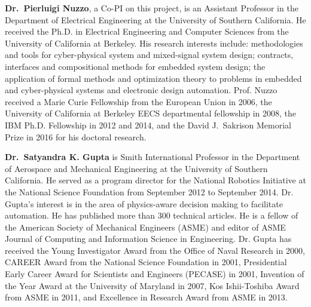 \documentclass[12pt]{dod-blank}
\begin{document}
{\bf Dr.\ Pierluigi Nuzzo}, a Co-PI on this project, is an Assistant Professor in the Department of Electrical Engineering at the University of Southern California. He received the Ph.D. in Electrical Engineering and Computer Sciences from the University of California at Berkeley. 
%
His research interests
include: methodologies and tools for cyber-physical system and mixed-signal
system design; contracts, interfaces and compositional methods for embedded
system design; the application of formal methods and optimization theory to problems in embedded and cyber-physical systems and electronic design automation. 
%
Prof. Nuzzo received %
a Marie Curie Fellowship
from the European Union in 2006, 
the University of California at Berkeley EECS
departmental fellowship in 2008, 
the IBM Ph.D.
Fellowship in 2012 and 2014, 
and the David J.~Sakrison Memorial Prize in 2016 for his doctoral research. 

{\bf Dr.\ Satyandra K. Gupta} is Smith International Professor in the Department of Aerospace and Mechanical Engineering at the University of Southern California. %
He served as a program director for the National Robotics Initiative at the National Science Foundation from September 2012 to September 2014.  Dr. Gupta's interest is in the area of physics-aware decision making to facilitate automation. He has published more than 300 technical articles. He is a fellow of the American Society of Mechanical Engineers (ASME) and editor of ASME Journal of Computing and Information Science in Engineering. Dr. Gupta has received the Young Investigator Award from the Office of Naval Research in 2000, CAREER Award from the National Science Foundation in 2001, Presidential Early Career Award for Scientists and Engineers (PECASE) in 2001, Invention of the Year Award at the University of Maryland in 2007, Kos Ishii-Toshiba Award from ASME in 2011, and Excellence in Research Award from ASME in 2013.%
\end{document}

